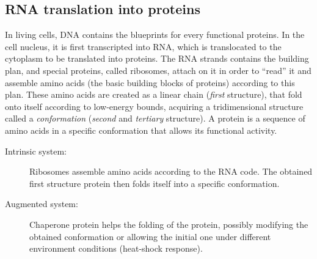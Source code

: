 
\subsection{RNA translation into proteins} %
\label{sub:protein_biosynthesis}
In living cells, DNA contains the blueprints for every functional proteins. In the cell nucleus, it is first transcripted into RNA, which is translocated to the cytoplasm to be translated into proteins. The RNA strands contains the building plan, and special proteins, called ribosomes, attach on it in order to ``read'' it and assemble amino acids (the basic building blocks of proteins) according to this plan. These amino acids are created as a linear chain (\textit{first} structure), that fold onto itself according to low-energy bounds, acquiring a tridimensional structure called a \textit{conformation} (\textit{second} and \textit{tertiary} structure). A protein is a sequence of amino acids in a specific conformation that allows its functional activity.

\begin{description}
	\item[Intrinsic system:] Ribosomes assemble amino acids according to the RNA code. The obtained first structure protein then folds itself into a specific conformation.
	\item[Augmented system:] Chaperone protein helps the folding of the protein, possibly modifying the obtained conformation or allowing the initial one under different environment conditions (heat-shock response).
\end{description}
